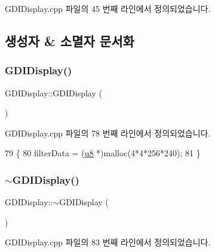 G\+D\+I\+Display.\+cpp 파일의 45 번째 라인에서 정의되었습니다.



\subsection{생성자 \& 소멸자 문서화}
\mbox{\label{class_g_d_i_display_a31a11d8bcf225bc71429c054b776793c}} 
\subsubsection{\texorpdfstring{G\+D\+I\+Display()}{GDIDisplay()}}
{\footnotesize\ttfamily G\+D\+I\+Display\+::\+G\+D\+I\+Display (\begin{DoxyParamCaption}{ }\end{DoxyParamCaption})}



G\+D\+I\+Display.\+cpp 파일의 78 번째 라인에서 정의되었습니다.


\begin{DoxyCode}
79 \{
80   filterData = (\mbox{\hyperlink{_system_8h_aed742c436da53c1080638ce6ef7d13de}{u8}} *)malloc(4*4*256*240);
81 \}
\end{DoxyCode}
\mbox{\label{class_g_d_i_display_afedb6dc098b7138a2dc311f1b9fd67ed}} 
\subsubsection{\texorpdfstring{$\sim$\+G\+D\+I\+Display()}{~GDIDisplay()}}
{\footnotesize\ttfamily G\+D\+I\+Display\+::$\sim$\+G\+D\+I\+Display (\begin{DoxyParamCaption}{ }\end{DoxyParamCaption})\hspace{0.3cm}{\ttfamily [virtual]}}



G\+D\+I\+Display.\+cpp 파일의 83 번째 라인에서 정의되었습니다.


